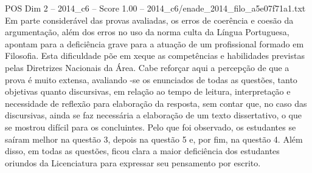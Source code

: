 \begin{textsample}{POS Dim 2 – 2014\_c6 – Score 1.00 – 2014\_c6/enade\_2014\_filo\_a5e07f71a1.txt}
Em parte considerável das provas avaliadas, os erros de coerência e coesão da argumentação, além dos erros no uso da norma culta da Língua Portuguesa, apontam para a deficiência grave para a atuação de um profissional formado em Filosofia.
Esta dificuldade põe em xeque as competências e habilidades previstas pelas Diretrizes Nacionais da Área.
Cabe reforçar aqui a percepção de que a prova é muito extensa, avaliando -se os enunciados de todas as questões, tanto objetivas quanto discursivas, em relação ao tempo de leitura, interpretação e necessidade de reflexão para elaboração da resposta, sem contar que, no caso das discursivas, ainda se faz necessária a elaboração de um texto dissertativo, o que se mostrou difícil para os concluintes.
Pelo que foi observado, os estudantes se saíram melhor na questão 3, depois na questão 5 e, por fim, na questão 4.
Além disso, em todas as questões, ficou clara a maior deficiência dos estudantes oriundos da Licenciatura para expressar seu pensamento por escrito.

\end{textsample}

